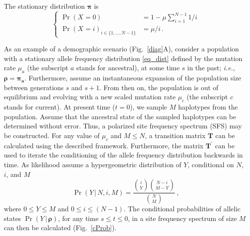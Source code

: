 \documentclass[preprint]{elsarticle}
\newcommand{\bs}[1]{\ensuremath{\boldsymbol{#1}}}
\newcommand\given{{\,|\,}}
\newcommand\ie{{\it i.e.,}}
\newcommand\x[1]{\ensuremath{X_{#1}}}
\newcommand\y{\ensuremath{Y}}
\begin{document}
The stationary distribution $\bs{\pi}$ is 
\begin{equation}\label{eq_dist}
\begin{cases}
\Pr(\x{}=0)&=1-\mu\sum_{i=1}^{N-1}1/i\\
\Pr(\x{}=i)_{i \in \{1, \ldots, N-1\}} &=\mu/i\,.
\end{cases}
\end{equation}

As an example of a demographic scenario (Fig.~\ref{diag}A), consider a population with a stationary allele frequency distribution \eqref{eq_dist} defined by the mutation rate $\mu_a$ (the subscript $a$ stands for ancestral), at some time $s$ in the past; \ie\ $\bs{\rho} = \bs{\pi_a}$. Furthermore, assume an instantaneous expansion of the population size between generations $s$ and $s+1$. From then on, the population is out of equilibrium and evolving with a new scaled mutation rate $\mu_c$ (the subscript $c$ stands for current). At present time ($t=0$), 
we sample $M$ haplotypes from the population. Assume that the ancestral state of the sampled haplotypes can be determined without error. Thus, a polarized site frequency spectrum (SFS) may be constructed. For any value of $\mu_c$ and $M \leq N$, a transition matrix $\mathbf{T}$ can be calculated using the described framework. Furthermore, the matrix $\mathbf{T}^{'}$ can be used to iterate the conditioning of the allele frequency distribution backwards in time. As likelihood assume a hypergeometric distribution of $Y$, conditional on $N$, $i$, and $M$
\begin{equation}\label{X0}
\Pr(\y\given N,i,M)=\frac{\binom{i}{\y}\binom{N-i}{M-\y}}{\binom{N}{M}}\,,
\end{equation}
where $0\leq \y\leq M$ and $0\leq i\leq (N-1)$. The conditional probabilities of allelic states $\Pr(\y \given \bs{\rho})$, for any time $s\leq t\leq 0$, in a site frequency spectrum of size $M$ can then be calculated (Fig.~\ref{cProb}). %
\end{document}
